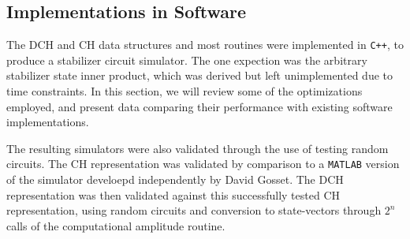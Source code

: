 \subsection{Implementations in Software}\label{sec:stabilizer_simulators}
The DCH and CH data structures and most routines were implemented in \texttt{C++}, to produce a stabilizer circuit simulator. The one expection was the arbitrary stabilizer state inner product, which was derived but left unimplemented due to time constraints. In this section, we will review some of the optimizations employed, and present data comparing their performance with existing software implementations.\par
The resulting simulators were also validated through the use of testing random circuits. The CH representation was validated by comparison to a \texttt{MATLAB} version of the simulator develoepd independently by David Gosset. The DCH representation was then validated against this successfully tested CH representation, using random circuits and conversion to state-vectors through $2^{n}$ calls of the computational amplitude routine.
